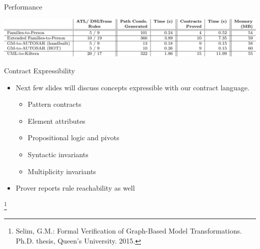 \documentclass[xcolor=dvipsnames, 12pt, handout]{beamer}
\newcommand\blfootnote[1]{%
  \begingroup
  \renewcommand\thefootnote{}\footnote{#1}%
  \addtocounter{footnote}{-1}%
  \endgroup
}
\begin{document}
\begin{frame}{Performance}
\begin{center}
\includegraphics[width=\textwidth]{figures/performance}
\end{center}
\end{frame}

\begin{frame}{Contract Expressibility}

\begin{itemize}[<+->]
\item Next few slides will discuss concepts expressible with our contract language.

\begin{itemize}[<+->]
\item Pattern contracts
\item Element attributes
\item Propositional logic and pivots
\item Syntactic invariants
\item Multiplicity invariants
\end{itemize}
\end{itemize}

\begin{itemize}
\item Prover reports rule reachability as well
\end{itemize}

\blfootnote{Selim, G.M.: Formal Verification of Graph-Based Model Transformations. Ph.D. thesis, Queen’s University. 2015.}
\end{frame}
\end{document}
